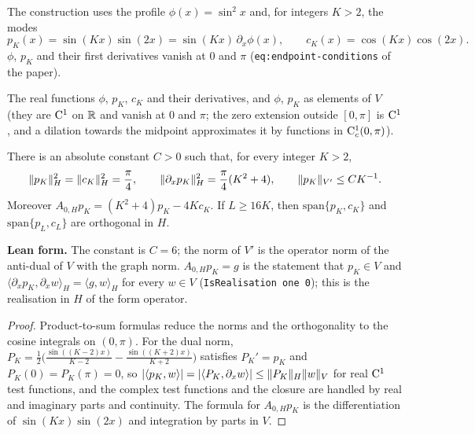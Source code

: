 The construction uses the profile $\phi(x)=\sin^2x$ and, for integers $K>2$, the modes
\[
  p_K(x)=\sin(Kx)\sin(2x)=\sin(Kx)\,\partial_x\phi(x),\qquad c_K(x)=\cos(Kx)\cos(2x).
\]
$\phi$, $p_K$ and their first derivatives vanish at $0$ and $\pi$
(\texttt{eq:endpoint-conditions} of the paper).

\begin{definition}
  \label{def:modes}
  \leanok
  The real functions $\phi$, $p_K$, $c_K$ and their derivatives, and $\phi$, $p_K$ as
  elements of $V$ (they are $\mathrm{C}^1$ on $\mathbb{R}$ and vanish at $0$ and $\pi$; the zero extension
  outside $[0,\pi]$ is $\mathrm{C}^1$, and a dilation towards the midpoint approximates it by
  functions in $\mathrm{C}_c^1(0,\pi)$).
\end{definition}

\begin{lemma}
  \label{lem:oscillatory-modes}
  \leanok
  There is an absolute constant $C>0$ such that, for every integer $K>2$,
  \[
    \lVert p_K\rVert_H^2=\lVert c_K\rVert_H^2=\frac\pi4,\qquad
    \lVert \partial_xp_K\rVert_H^2=\frac\pi4(K^2+4),\qquad \lVert p_K\rVert_{V'}\leq CK^{-1}.
  \]
  Moreover $A_{0,H}p_K=(K^2+4)p_K-4Kc_K$.  If $L\geq16K$, then
  $\mathrm{span}\{p_K,c_K\}$ and $\mathrm{span}\{p_L,c_L\}$ are orthogonal in $H$.
\end{lemma}

\textbf{Lean form.}  The constant is $C=6$; the norm of $V'$ is the operator norm of the
anti-dual of $V$ with the graph norm.  $A_{0,H}p_K=g$ is the statement that $p_K\in V$ and
$\langle\partial_xp_K,\partial_xw\rangle_H=\langle g,w\rangle_H$ for every $w\in V$
(\texttt{IsRealisation one 0}); this is the realisation in $H$ of the form operator.

\begin{proof}
  \leanok
  Product-to-sum formulas reduce the norms and the orthogonality to the cosine integrals on
  $(0,\pi)$.  For the dual norm, $P_K=\frac12\bigl(\frac{\sin((K-2)x)}{K-2}-\frac{\sin((K+2)x)}{K+2}\bigr)$
  satisfies $P_K'=p_K$ and $P_K(0)=P_K(\pi)=0$, so
  $\lvert \langle p_K,w\rangle\rvert=\lvert \langle P_K,\partial_xw\rangle\rvert\leq\lVert P_K\rVert_H\lVert w\rVert_V$ for
  real $\mathrm{C}^1$ test functions, and the complex test functions and the closure are handled by real
  and imaginary parts and continuity.  The formula for $A_{0,H}p_K$ is the differentiation of
  $\sin(Kx)\sin(2x)$ and integration by parts in $V$.
\end{proof}

